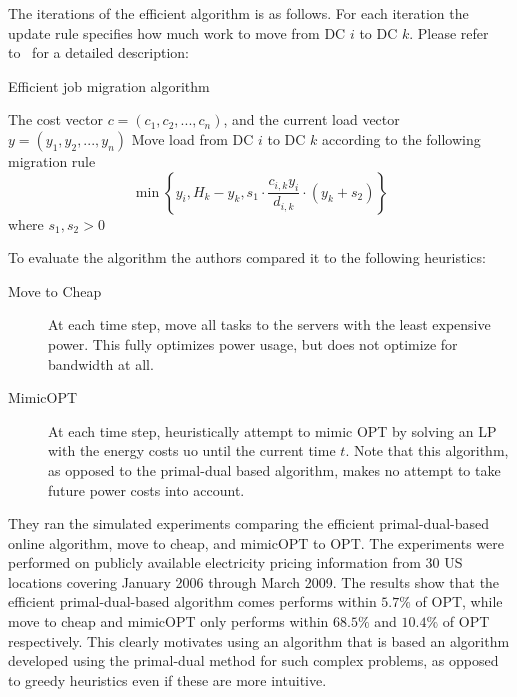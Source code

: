 The iterations of the efficient algorithm is as follows. For each iteration the update rule specifies how much work to move from DC $i$ to DC $k$. Please refer to~\cite{buchbinder11:job-migration-techreport} for a detailed description:

\begin{algorithm}
\caption{Efficient job migration algorithm}
\label{job-migration-alg}
\begin{algorithmic}[1]
\REQUIRE The cost vector $c=(c_1,c_2,...,c_n)$, and the current load vector $y=(y_1,y_2,...,y_n)$
  \STATE Move load from DC $i$ to DC $k$ according to the following migration rule 
   \[ 
    \min \left\{ y_i, H_k - y_{k}, s_1 \cdot \frac{c_{i,k}y_i}{d_{i,k}} \cdot (y_k + s_2) \right\}
   \]
   where $s_1,s_2 > 0$
 \ENDFOR
\ENDFOR
\end{algorithmic}
\end{algorithm}

To evaluate the algorithm the authors compared it to the following heuristics:
\begin{description}
 \item[Move to Cheap] At each time step, move all tasks to the servers with the least expensive power. This fully optimizes power usage, but does not optimize for bandwidth at all.
 \item[MimicOPT] At each time step, heuristically attempt to mimic OPT by solving an LP with the energy costs uo until the current time $t$. Note that this algorithm, as opposed to the primal-dual based algorithm, makes no attempt to take future power costs into account.
\end{description}

They ran the simulated experiments comparing the efficient primal-dual-based online algorithm, move to cheap, and mimicOPT to OPT.
The experiments were performed on publicly available electricity pricing information from 30 US locations covering January 2006 through March 2009.
The results show that the efficient primal-dual-based algorithm comes performs within $5.7\%$ of OPT, while move to cheap and mimicOPT only performs within $68.5\%$ and $10.4\%$ of OPT respectively.
This clearly motivates using an algorithm that is based an algorithm developed using the primal-dual method for such complex problems, as opposed to greedy heuristics even if these are more intuitive.



